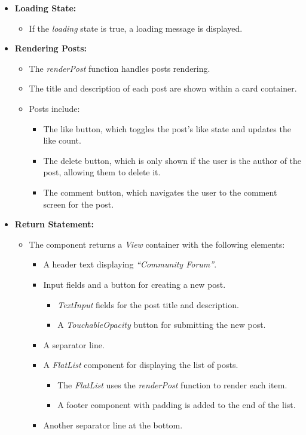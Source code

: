 \begin{itemize}
    \item \textbf{Loading State:}
    \begin{itemize}
        \item If the \textit{loading} state is true, a loading message is displayed.
    \end{itemize}

    \item \textbf{Rendering Posts:}
    \begin{itemize}
        \item The \textit{renderPost} function handles posts rendering.
        \item The title and description of each post are shown within a card container.
        \item Posts include:
        \begin{itemize}
            \item The like button, which toggles the post's like state and updates the like count.
            \item The delete button, which is only shown if the user is the author of the post, allowing them to delete it.
            \item The comment button, which navigates the user to the comment screen for the post.
        \end{itemize}
    \end{itemize}

    \item \textbf{Return Statement:}
    \begin{itemize}
        \item The component returns a \textit{View} container with the following elements:
        \begin{itemize}
            \item A header text displaying \textit{``Community Forum''}.
            \item Input fields and a button for creating a new post.
            \begin{itemize}
                \item \textit{TextInput} fields for the post title and description.
                \item A \textit{TouchableOpacity} button for submitting the new post.
            \end{itemize}
            \item A separator line.
            \item A \textit{FlatList} component for displaying the list of posts.
            \begin{itemize}
                \item The \textit{FlatList} uses the \textit{renderPost} function to render each item.
                \item A footer component with padding is added to the end of the list.
            \end{itemize}
            \item Another separator line at the bottom.
        \end{itemize}
    \end{itemize}
\end{itemize}

